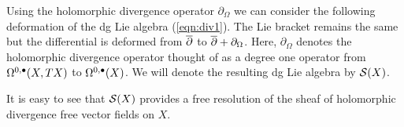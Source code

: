 \documentclass[11pt]{amsart}
\def\pv{{\rm PV}}
\begin{document}
Using the holomorphic divergence operator $\partial_\Omega$ we can consider the following deformation of the dg Lie algebra (\ref{eqn:div1}).
The Lie bracket remains the same but the differential is deformed from $\overline{\partial}$ to $\overline{\partial} + \partial_\Omega$.
Here, $\partial_{\Omega}$ denotes the holomorphic divergence operator thought of as a degree one operator from $\Omega^{0,\bullet}(X, TX)$ to $\Omega^{0,\bullet}(X)$.
We will denote the resulting dg Lie algebra by $\mathcal S(X)$.

It is easy to see that $\mathcal S(X)$ provides a free resolution of the sheaf of holomorphic divergence free vector fields on $X$.






\end{document}
